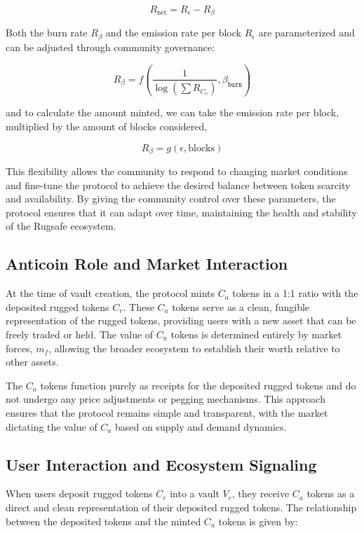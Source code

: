 \documentclass{article}
\begin{document}
\[
R_{\text{net}} = R_{\epsilon} - R_{\beta}
\]

Both the burn rate $R_{\beta}$ and the emission rate per block $R_\epsilon$ are parameterized and can be adjusted through community governance:

\[
R_\beta = f\left(\frac{1}{\log\left(\sum R_{C_v}\right)}, \beta_{\texttt{burn}}\right)
\]


and to calculate the amount minted, we can take the emission rate per block, multiplied by the amount of blocks considered,

\[
R_{\beta} = g(\epsilon, \text{blocks})
\]

This flexibility allows the community to respond to changing market conditions and fine-tune the protocol to achieve the desired balance between token scarcity and availability. By giving the community control over these parameters, the protocol ensures that it can adapt over time, maintaining the health and stability of the Rugsafe ecosystem.











\subsection{Anticoin Role and Market Interaction}
At the time of vault creation, the protocol mints $C_a$ tokens in a 1:1 ratio with the deposited rugged tokens $C_r$. These $C_a$ tokens serve as a clean, fungible representation of the rugged tokens, providing users with a new asset that can be freely traded or held. The value of $C_a$ tokens is determined entirely by market forces, \(m_f\), allowing the broader ecosystem to establish their worth relative to other assets.

The $C_a$ tokens function purely as receipts for the deposited rugged tokens and do not undergo any price adjustments or pegging mechanisms. This approach ensures that the protocol remains simple and transparent, with the market dictating the value of $C_a$ based on supply and demand dynamics.








\subsection{User Interaction and Ecosystem Signaling}
When users deposit rugged tokens $C_r$ into a vault $V_c$, they receive $C_a$ tokens as a direct and clean representation of their deposited rugged tokens. The relationship between the deposited tokens and the minted $C_a$ tokens is given by:
\end{document}
